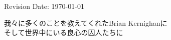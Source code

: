 \vspace{1cm}

\noindent Revision Date: \today \\

\normalsize

\newpage

\thispagestyle{empty}

\vspace*{5cm}
\begin{center}
\hspace{0cm}我々に多くのことを教えてくれたBrian Kernighanに\\
そして世界中にいる良心の囚人たちに
\end{center}

\newpage

\thispagestyle{empty}
\mbox{}    %

